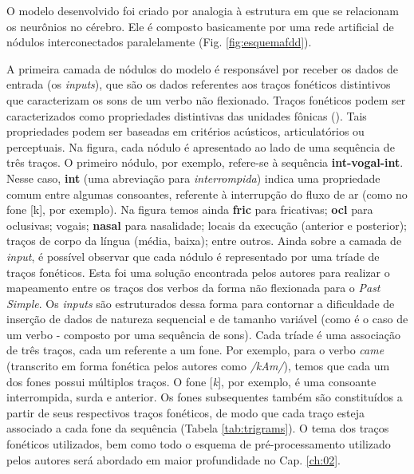 


O modelo desenvolvido foi criado por analogia à estrutura em que se relacionam os neurônios no cérebro. Ele é composto basicamente por uma rede artificial de nódulos interconectados paralelamente (Fig. \ref{fig:esquemafdd}).

A primeira camada de nódulos do modelo é responsável por receber os dados de entrada (os \textit{inputs}), que são os dados referentes aos traços fonéticos distintivos que caracterizam os sons de um verbo não flexionado. Traços fonéticos podem ser caracterizados como propriedades distintivas das unidades fônicas (\cite{paraconhecer:2015}). Tais propriedades podem ser baseadas em critérios acústicos, articulatórios ou perceptuais. Na figura, cada nódulo é apresentado ao lado de uma sequência de três traços. O primeiro nódulo, por exemplo, refere-se à sequência \textbf{int-vogal-int}. Nesse caso, \textbf{int} (uma abreviação para \textit{interrompida}) indica uma propriedade comum entre algumas consoantes, referente à interrupção do fluxo de ar (como no fone [k], por exemplo). Na figura temos ainda \textbf{fric} para fricativas; \textbf{ocl} para oclusivas; vogais; \textbf{nasal} para nasalidade; locais da execução (anterior e posterior); traços de corpo da língua (média, baixa); entre outros. Ainda sobre a camada de \textit{input}, é possível observar que cada nódulo é representado por uma tríade de traços fonéticos. Esta foi uma solução encontrada pelos autores para realizar o mapeamento entre os traços dos verbos da forma não flexionada para o \textit{Past Simple}. Os \textit{inputs} são estruturados dessa forma para contornar a dificuldade de inserção de dados de natureza sequencial e de tamanho variável (como é o caso de um verbo - composto por uma sequência de sons). Cada tríade é uma associação de três traços, cada um referente a um fone. Por exemplo, para o verbo \textit{came} (transcrito em forma fonética pelos autores como \textit{/kAm/}), temos que cada um dos fones possui múltiplos traços. O fone [\textit{k}], por exemplo, é uma consoante interrompida, surda e anterior. Os fones subsequentes também são constituídos a partir de seus respectivos traços fonéticos, de modo que cada traço esteja associado a cada fone da sequência (Tabela \ref{tab:trigrams}). O tema dos traços fonéticos utilizados, bem como todo o esquema de pré-processamento utilizado pelos autores será abordado em maior profundidade no Cap. \ref{ch:02}.

